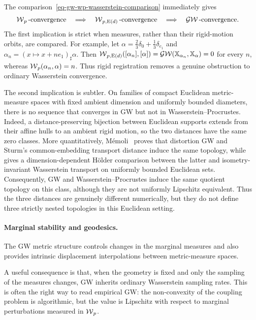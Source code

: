 \begin{rem}\label{rem-gw-wp-topologies}
The comparison~\eqref{eq-gw-wp-wasserstein-comparison} immediately gives
\[
	\operatorname{\mathcal{W}}_p\text{-convergence}
	\quad\Longrightarrow\quad
	\operatorname{\mathcal{W}}_{p,\mathrm E(d)}\text{-convergence}
	\quad\Longrightarrow\quad
	\operatorname{\mathcal{GW}}\text{-convergence}.
\]
The first implication is strict when measures, rather than their rigid-motion orbits, are compared. For example, let $\alpha=\tfrac23\delta_0+\tfrac13\delta_{e_1}$ and $\alpha_n=(x\mapsto x+ne_1)_\sharp\alpha$. Then $\operatorname{\mathcal{W}}_{p,\mathrm E(d)}([\alpha_n],[\alpha])=\operatorname{\mathcal{GW}}(\mathbb{X}_{\alpha_n},\mathbb{X}_\alpha)=0$ for every $n$, whereas $\operatorname{\mathcal{W}}_p(\alpha_n,\alpha)=n$. Thus rigid registration removes a genuine obstruction to ordinary Wasserstein convergence.

The second implication is subtler. On families of compact Euclidean metric-measure spaces with fixed ambient dimension and uniformly bounded diameters, there is no sequence that converges in GW but not in Wasserstein--Procrustes. Indeed, a distance-preserving bijection between Euclidean supports extends from their affine hulls to an ambient rigid motion, so the two distances have the same zero classes. More quantitatively, M\'emoli~\cite{memoli-2011} proves that distortion GW and Sturm's common-embedding transport distance induce the same topology, while~\cite{memoli-2008} gives a dimension-dependent H\"older comparison between the latter and isometry-invariant Wasserstein transport on uniformly bounded Euclidean sets. Consequently, GW and Wasserstein--Procrustes induce the same quotient topology on this class, although they are not uniformly Lipschitz equivalent. Thus the three distances are genuinely different numerically, but they do not define three strictly nested topologies in this Euclidean setting.
\end{rem}

\paragraph{Marginal stability and geodesics.}
The GW metric structure controls changes in the marginal measures and also provides intrinsic displacement interpolations between metric-measure spaces.

A useful consequence is that, when the geometry is fixed and only the sampling of the measures changes, GW inherits ordinary Wasserstein sampling rates. This is often the right way to read empirical GW: the non-convexity of the coupling problem is algorithmic, but the value is Lipschitz with respect to marginal perturbations measured in $\operatorname{\mathcal{W}}_p$.

